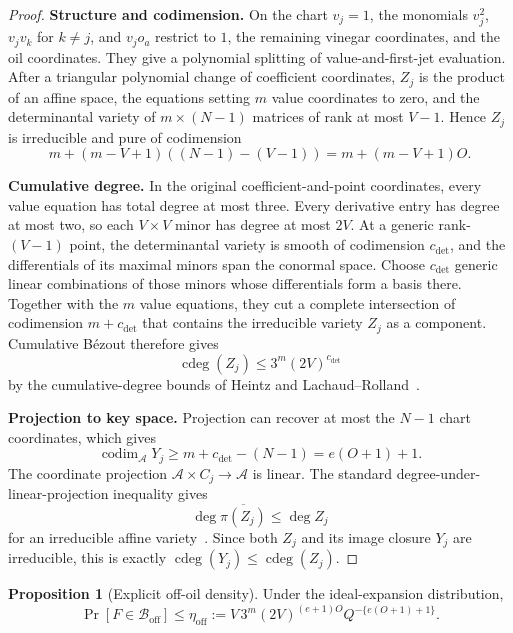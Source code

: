 \documentclass[11pt,a4paper]{article}
\theoremstyle{definition}
\newtheorem{proposition}[theorem]{Proposition}
\theoremstyle{remark}
\newcommand{\cB}{\mathcal B}
\newcommand{\codim}{\operatorname{codim}}
\newcommand{\cdeg}{\operatorname{cdeg}}
\newcommand{\off}{\mathrm{off}}
\newcommand{\proofstep}[1]{\par\smallskip\noindent\textbf{#1}\enspace}
\begin{document}
\begin{proof}
\proofstep{Structure and codimension.}
On the chart $v_j=1$, the monomials $v_j^2$, $v_jv_k$ for $k\ne j$, and $v_jo_a$ restrict to $1$, the remaining vinegar coordinates, and the oil coordinates.  They give a polynomial splitting of value-and-first-jet evaluation.  After a triangular polynomial change of coefficient coordinates, $Z_j$ is the product of an affine space, the equations setting $m$ value coordinates to zero, and the determinantal variety of $m\times(N-1)$ matrices of rank at most $V-1$.  Hence $Z_j$ is irreducible and pure of codimension
\[
m+(m-V+1)((N-1)-(V-1))=m+(m-V+1)O.
\]

\proofstep{Cumulative degree.}
In the original coefficient-and-point coordinates, every value equation has total degree at most three.  Every derivative entry has degree at most two, so each $V\times V$ minor has degree at most $2V$.  At a generic rank-$(V-1)$ point, the determinantal variety is smooth of codimension $c_{\det}$, and the differentials of its maximal minors span the conormal space.  Choose $c_{\det}$ generic linear combinations of those minors whose differentials form a basis there.  Together with the $m$ value equations, they cut a complete intersection of codimension $m+c_{\det}$ that contains the irreducible variety $Z_j$ as a component.  Cumulative B\'ezout therefore gives
\[
\cdeg(Z_j)\le 3^m(2V)^{c_{\det}}
\]
by the cumulative-degree bounds of Heintz and Lachaud--Rolland~\cite{Heintz,LachaudRolland}.

\proofstep{Projection to key space.}
Projection can recover at most the $N-1$ chart coordinates, which gives
\[
\codim_{\mathcal A}Y_j\ge m+c_{\det}-(N-1)=e(O+1)+1.
\]
The coordinate projection $\mathcal A\times C_j\to\mathcal A$ is linear.  The standard degree-under-linear-projection inequality gives
\[
\deg \overline{\pi(Z_j)}\le\deg Z_j
\]
for an irreducible affine variety~\cite{Heintz,LachaudRolland}.  Since both $Z_j$ and its image closure $Y_j$ are irreducible, this is exactly $\cdeg(Y_j)\le\cdeg(Z_j)$.
\end{proof}

\begin{proposition}[Explicit off-oil density]\label{prop:off-density}
Under the ideal-expansion distribution,
\begin{equation}\label{eq:etaoff}
\Pr[F\in\cB_{\off}]
\le
\eta_{\off}:=
V\,3^m(2V)^{(e+1)O}
Q^{-\{e(O+1)+1\}}.
\end{equation}
\end{proposition}
\end{document}
